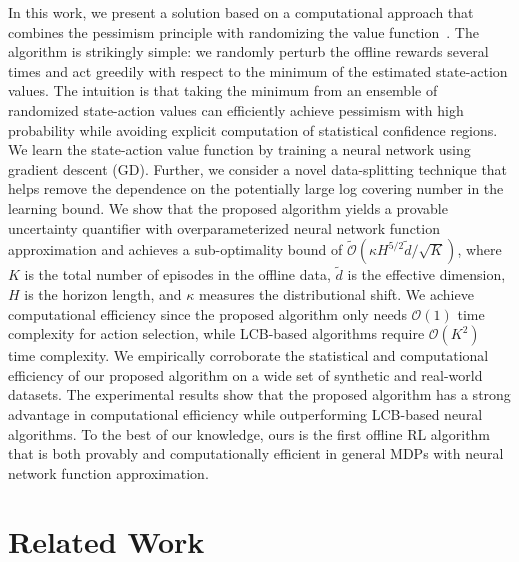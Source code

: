 \documentclass{article} \usepackage{iclr2023/iclr2023_conference,times}
\begin{document}
In this work, we present a solution based on a computational approach that combines the pessimism principle with randomizing the value function~\citep{osband2016generalization, ishfaq2021randomized}. The algorithm is strikingly simple: we randomly perturb the offline rewards several times and act greedily with respect to the minimum of the estimated state-action values. The intuition is that taking the minimum from an ensemble of randomized state-action values can efficiently achieve pessimism with high probability while avoiding explicit computation of statistical confidence regions. We learn the state-action value function by training a neural network using gradient descent (GD). Further, we consider a novel data-splitting technique that helps remove the dependence on the potentially large log covering number in the learning bound. We show that the proposed algorithm yields a provable uncertainty quantifier with overparameterized neural network function approximation and achieves a sub-optimality bound of  $\tilde{\mathcal{O}}(  \kappa H^{5/2}  \tilde{d}/{\sqrt{K}} )$, where $K$ is the total number of episodes in the offline data, $\tilde{d}$ is the effective dimension, $H$ is the horizon length, and $\kappa$ measures the distributional shift. We achieve computational efficiency since the proposed algorithm only needs $\mathcal{O}(1)$ time complexity for action selection, while LCB-based algorithms require  $\mathcal{O}(K^2)$ time complexity. We empirically corroborate the statistical and computational efficiency of our proposed algorithm on a wide set of synthetic and real-world datasets. The experimental results show that the proposed algorithm has a strong advantage in computational efficiency while outperforming LCB-based neural algorithms. To the best of our knowledge, ours is the first offline RL algorithm that is both provably and computationally efficient in general MDPs with neural network function approximation. 


















%
 \section{Related Work}
\end{document}
